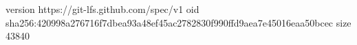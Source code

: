 version https://git-lfs.github.com/spec/v1
oid sha256:420998a276716f7dbea93a48ef45ac2782830f990ffd9aea7e45016eaa50bcec
size 43840
